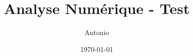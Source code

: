 \documentclass[11pt, a4paper]{article}
\title{Analyse Numérique - Test}
\author{Antonio}
\date{\today}
\begin{document}
\maketitle
\cite{bodinDeepmathMathematiquesSimples}



\end{document}
